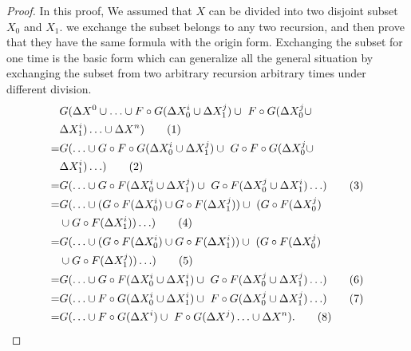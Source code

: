 {\begin{proof}
	\label{sec:app:proof:correct}
	In this proof, We assumed that $X$ can be divided into two disjoint subset $X_0$ and $X_1$. we exchange the subset belongs to any two  recursion, and then prove that they have the same formula with the origin form. Exchanging the subset for one time is the basic form which can generalize all the general situation by exchanging the subset from two arbitrary recursion arbitrary times under different division.
	\begin{align}
	&G(\Delta X^0\cup \ldots \cup F\circ G(\Delta X^{i}_0 \cup \Delta X^{j}_1)\cup\ F\circ G(\Delta X^{j}_0 \cup \notag\\ &\Delta X^{i}_1) \ldots\cup \Delta X^n)\tag{1} \\
	=&G( \ldots \cup G \circ F\circ G(\Delta X^{i}_0 \cup \Delta X^{{j}}_1)\cup\ G \circ F\circ G(\Delta X^{{j}}_0 \cup \notag\\ &\Delta X^{i}_1) \ldots)\tag{2} \\
	=&G( \ldots \cup G \circ F(\Delta X^{i}_0 \cup \Delta X^{{j}}_1)\cup\ G \circ F(\Delta X^{{j}}_0 \cup \Delta X^{{i}}_1) \ldots)\tag{3} \\
	=&G( \ldots \cup (G\circ F(\Delta X^{i}_0) \cup G\circ F(\Delta X^{{j}}_1))\cup\ (G \circ F(\Delta X^{{j}}_0) \notag\\ &\cup G \circ F(\Delta X^{i}_1)) \ldots )\tag{4} \\
	=&G( \ldots \cup (G\circ F(\Delta X^{i}_0) \cup G\circ F(\Delta X^{i}_1))\cup\ (G \circ F(\Delta X^{{j}}_0) \notag\\ &\cup G  \circ F(\Delta X^{{j}}_1)) \ldots )\tag{5} \\
	=&G( \ldots \cup G \circ F(\Delta X^{i}_0 \cup \Delta X^{{i}}_1)\cup\ G \circ F(\Delta X^{{j}}_0 \cup \Delta X^{{j}}_1) \ldots)\tag{6} \\
	=&G( \ldots \cup F \circ G(\Delta X^{i}_0 \cup \Delta X^{{i}}_1)\cup\ F \circ G(\Delta X^{{j}}_0 \cup \Delta X^{{j}}_1) \ldots)\tag{7} \\
	=&G(\ldots \cup F \circ G(\Delta X^i)\cup\ F \circ G(\Delta X^{j}) \ldots\cup \Delta X^n).\tag{8}
	\end{align}
	

\end{proof}}
